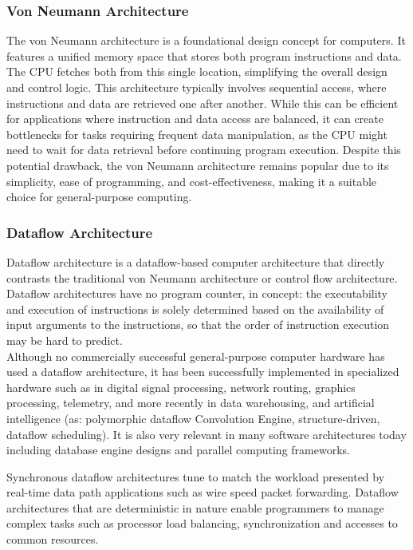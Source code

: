 \documentclass[9pt,a4paper,twoside]{tau}
\begin{document}
        \subsubsection{Von Neumann Architecture}
        The von Neumann architecture is a foundational design concept for computers. It features a unified memory space that stores both program instructions and data. The CPU fetches both from this single location, simplifying the overall design and control logic. This architecture typically involves sequential access, where instructions and data are retrieved one after another. While this can be efficient for applications where instruction and data access are balanced, it can create bottlenecks for tasks requiring frequent data manipulation, as the CPU might need to wait for data retrieval before continuing program execution. Despite this potential drawback, the von Neumann architecture remains popular due to its simplicity, ease of programming, and cost-effectiveness, making it a suitable choice for general-purpose computing.

        \subsubsection{Dataflow Architecture}
        Dataflow architecture is a dataflow-based computer architecture that directly contrasts the traditional von Neumann architecture or control flow architecture. Dataflow architectures have no program counter, in concept: the executability and execution of instructions is solely determined based on the availability of input arguments to the instructions, so that the order of instruction execution may be hard to predict.\\

        Although no commercially successful general-purpose computer hardware has used a dataflow architecture, it has been successfully implemented in specialized hardware such as in digital signal processing, network routing, graphics processing, telemetry, and more recently in data warehousing, and artificial intelligence (as: polymorphic dataflow Convolution Engine, structure-driven, dataflow scheduling). It is also very relevant in many software architectures today including database engine designs and parallel computing frameworks.

        Synchronous dataflow architectures tune to match the workload presented by real-time data path applications such as wire speed packet forwarding. Dataflow architectures that are deterministic in nature enable programmers to manage complex tasks such as processor load balancing, synchronization and accesses to common resources.
\end{document}
